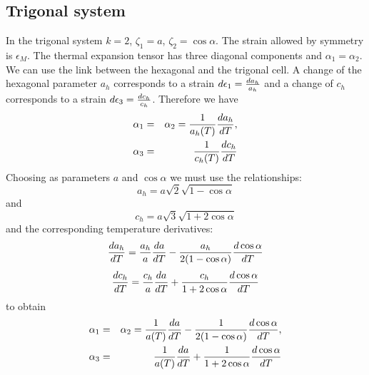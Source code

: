 \documentclass[12pt,a4paper]{article}
\begin{document}
\subsection{\color{web-blue}Trigonal system}
In the trigonal system $k=2$, $\zeta_1=a$, $\zeta_2=\cos\alpha$. The 
strain allowed by symmetry is $\epsilon_M$. The thermal expansion tensor
has three diagonal components and $\alpha_1=\alpha_2$. We can use the
link between the hexagonal and the trigonal cell. A change of the 
hexagonal parameter $a_h$ corresponds to a strain 
${d\epsilon_1}={da_h \over a_h}$ and a change of $c_h$ corresponds to a
strain ${d\epsilon_3}={d c_h \over c_h}$. Therefore 
we have
\begin{eqnarray}
\alpha_1 &=& \alpha_2= {1\over a_h(T)} {d a_h \over dT}, \\
\alpha_3 &=& {1\over c_h(T)} {dc_h \over d T}
\end{eqnarray}
Choosing as parameters $a$ and $\cos \alpha$ we must use the relationships:
\begin{equation}
a_h= a \sqrt{2} \sqrt{1-\cos\alpha}
\end{equation}
and 
\begin{equation}
c_h= a \sqrt{3} \sqrt{1+2\cos\alpha}
\end{equation}
and the corresponding temperature derivatives:
\begin{equation}
{d a_h \over d T}= {a_h \over a} {d a \over d T} - {a_h \over 2(1-\cos\alpha)}{d \cos\alpha \over d T}
\end{equation}
\begin{equation}
{d c_h \over d T}= {c_h \over a} {d a \over d T} + {c_h \over 1+2\cos\alpha}{d \cos\alpha \over d T}
\end{equation}
to obtain
\begin{eqnarray}
\alpha_1 &=& \alpha_2= {1\over a(T)} {d a \over dT} - {1 \over 2(1-\cos\alpha)}{d \cos\alpha \over d T}, \\
\alpha_3 &=& {1\over a(T)} {d a \over dT} + {1 \over 1+2\cos\alpha}
{d \cos\alpha \over d T}
\end{eqnarray}
\end{document}
